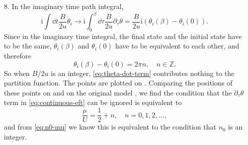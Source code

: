 \documentclass[hyperref, a4paper]{article}
\newcommand*{\ii}{\mathrm{i}}
\begin{document}
\begin{itemize}
\item[8.] In the imaginary time path integral,
\begin{equation}
    \ii \int \dd{t} \frac{B}{2u} \dot{\theta}_i \longrightarrow 
    \ii \int_0^{\beta} \dd{\tau} \frac{B}{2u} \partial_\tau \theta 
    = \frac{B}{2u} \ii (\theta_i(\beta) - \theta_i(0)).
    \label{eq:theta-dot-term}
\end{equation}
Since in the imaginary time integral,
the final state and the initial state have to be the same,
$\theta_i(\beta)$ and $\theta_i(0)$ have to be equivalent to each other,
and therefore 
\begin{equation}
    \theta_i(\beta) - \theta_i(0) = 2\pi n, \quad n \in \mathbb{Z}.
\end{equation}
So when $B / 2u$ is an integer, \eqref{eq:theta-dot-term} contributes nothing to the partition function.
The points are plotted on .
Comparing the positions of these points on  and
on the original model ,
we find the condition that the $\partial_\tau \theta$ term in \eqref{eq:continuous-eft} can be ignored 
is equivalent to 
\[
    \frac{\mu}{U} = \frac{1}{2} + n, \quad n = 0, 1, 2, \ldots,
\]
and from \eqref{eq:n0-mu} we know this is equivalent to the condition that $n_0$ is an integer.

\end{itemize}

%
\end{document}

